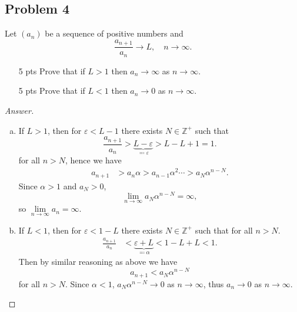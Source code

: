 \documentclass[12pt]{article}
\newcommand{\z}{\mathbb{Z}}
\newcommand\paren[1]{\left( #1 \right)}
\newcommand{\eps}{\varepsilon}
\theoremstyle{definition}
\begin{document}
\subsection{Problem 4}
Let $\paren{ a_n }$ be a sequence of positive numbers and 
\[
    \frac{a_{n+1}}{a_n} \to L, \quad n \to \infty.
\]
\begin{enumerate}[a.]
    \item [5 pts] Prove that if $L > 1$ then $a_n \to \infty$ as $n \to \infty$.
    \item [5 pts] Prove that if $L < 1$ then $a_n \to 0$ as $n \to \infty$.
\end{enumerate}
\begin{proof}[Answer]
    \noindent
    \begin{enumerate}[a.]
        \item If $L > 1$, then for $\eps < L - 1$ there exists $N \in \z^+$ such that 
        \[
            \frac{a_{n+1}}{a_n} > \underbrace{ L - \eps }_{ \eqqcolon \eps } > L - L + 1 = 1 . 
        \]
        for all $n > N$, hence we have
        \begin{align*}
            a_{n+1} & > a_n \alpha > a_{n-1} \alpha^2 \dotsb > a_N \alpha^{n-N}.
        \end{align*}
        Since $\alpha > 1$ and $a_N > 0$, 
        \[
            \lim\limits_{n \to \infty}  a_N \alpha^{n-N} = \infty,
        \]
        so $\lim\limits_{n \to \infty} a_n = \infty$.
        \item If $L < 1$, then for $\eps < 1 - L$ there exists $N \in \z^+$ such that for all $n > N$.
        \begin{align*}
            \frac{a_{n+1}}{a_n} & < \underbrace{ \eps + L }_{ \eqqcolon \alpha } < 1 - L + L < 1.
        \end{align*}
        Then by similar reasoning as above we have
        \[
            a_{n+1} < a_N \alpha^{n-N}
        \]
        for all $n > N$. Since $\alpha < 1$, $a_N \alpha^{n-N} \to 0$ as $n \to \infty$, thus $a_n \to 0$ as $n \to \infty$.
    \end{enumerate}
\end{proof}
\end{document}
